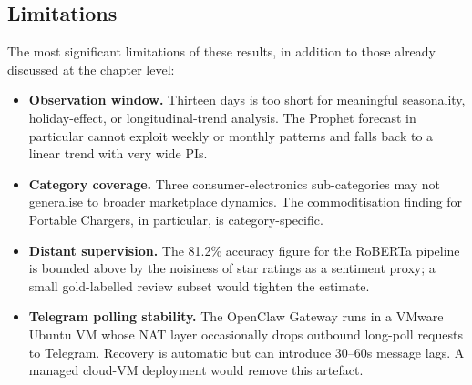 \subsection{Limitations}
\label{sec:limitations}

The most significant limitations of these results, in addition to those
already discussed at the chapter level:

\begin{itemize}
  \item \textbf{Observation window.} Thirteen days is too short for
  meaningful seasonality, holiday-effect, or longitudinal-trend analysis.
  The Prophet forecast in particular cannot exploit weekly or monthly
  patterns and falls back to a linear trend with very wide PIs.
  \item \textbf{Category coverage.} Three consumer-electronics
  sub-categories may not generalise to broader marketplace dynamics. The
  commoditisation finding for Portable Chargers, in particular, is
  category-specific.
  \item \textbf{Distant supervision.} The 81.2\% accuracy figure for the
  RoBERTa pipeline is bounded above by the noisiness of star ratings as a
  sentiment proxy; a small gold-labelled review subset would tighten the
  estimate.
  \item \textbf{Telegram polling stability.} The OpenClaw Gateway runs in a
  VMware Ubuntu VM whose NAT layer occasionally drops outbound long-poll
  requests to Telegram. Recovery is automatic but can introduce 30--60s
  message lags. A managed cloud-VM deployment would remove this artefact.
\end{itemize}
